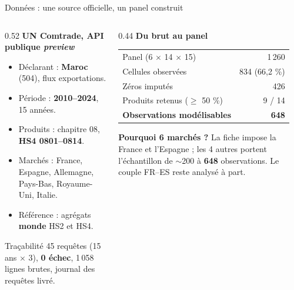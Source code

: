 \documentclass[aspectratio=169,10pt]{beamer}
\begin{document}
\begin{frame}{Données : une source officielle, un panel construit}
  \begin{columns}[T,onlytextwidth]
    \begin{column}{0.52\textwidth}
      \textbf{UN Comtrade, API publique \emph{preview}}
      \begin{itemize}
        \item Déclarant : \textbf{Maroc} (504), flux exportations.
        \item Période : \textbf{2010--2024}, 15 années.
        \item Produits : chapitre 08, \textbf{HS4 0801--0814}.
        \item Marchés : France, Espagne, Allemagne, Pays-Bas,
              Royaume-Uni, Italie.
        \item Référence : agrégats \textbf{monde} HS2 et HS4.
      \end{itemize}
      \vspace{0.2em}
      \begin{block}{Traçabilité}
        \small 45 requêtes (15 ans $\times$ 3), \textbf{0 échec}, 1\,058 lignes
        brutes, journal des requêtes livré.
      \end{block}
    \end{column}
    \begin{column}{0.44\textwidth}
      \textbf{Du brut au panel}
      \footnotesize
      \setlength{\tabcolsep}{4pt}
      \begin{tabular}{lr}
        \toprule
        Panel (6 $\times$ 14 $\times$ 15) & 1\,260 \\
        Cellules observées & 834 (66,2 \%) \\
        Zéros imputés & 426 \\
        Produits retenus ($\geq$ 50 \%) & 9 / 14 \\
        \textbf{Observations modélisables} & \textbf{648} \\
        \bottomrule
      \end{tabular}
      \vspace{0.5em}

      \footnotesize\textbf{Pourquoi 6 marchés ?} La fiche impose la France et
      l'Espagne ; les 4 autres portent l'échantillon de $\sim$200 à
      \textbf{648} observations. Le couple FR--ES reste analysé à part.
    \end{column}
  \end{columns}
\end{frame}
\end{document}
